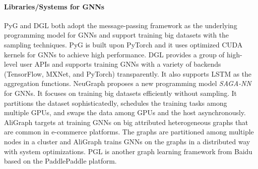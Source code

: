 \paragraph{Libraries/Systems for GNNs}

PyG \cite{PyG} and DGL \cite{DGL} both adopt the message-passing framework as the underlying programming model for GNNs and support training big datasets with the sampling techniques.
PyG \cite{PyG} is built upon PyTorch and it uses optimized CUDA kernels for GNNs to achieve high performance.
DGL \cite{DGL} provides a group of high-level user APIs and supports training GNNs with a variety of backends (TensorFlow, MXNet, and PyTorch) transparently.
It also supports LSTM as the aggregation functions.
NeuGraph \cite{ma2019_neugraph} proposes a new programming model \emph{SAGA-NN} for GNNs.
It focuses on training big datasets efficiently without sampling.
It partitions the dataset sophisticatedly, schedules the training tasks among multiple GPUs, and swaps the data among GPUs and the host asynchronously.
AliGraph \cite{zhu2019_aligraph} targets at training GNNs on big attributed heterogeneous graphs that are common in e-commerce platforms.
The graphs are partitioned among multiple nodes in a cluster and AliGraph trains GNNs on the graphs in a distributed way with system optimizations.
PGL \cite{PGL} is another graph learning framework from Baidu based on the PaddlePaddle platform.
